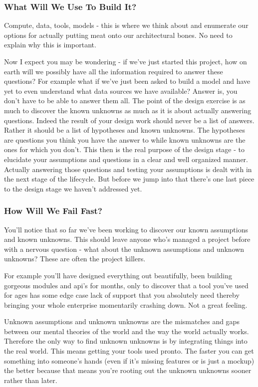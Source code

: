 \documentclass[10pt,a5paper]{book}
\begin{document}
\subsubsection{What Will We Use To Build It?}
Compute, data, tools, models - this is where we think about and enumerate our options for actually putting meat onto our architectural bones. No need to explain why this is important.

Now I expect you may be wondering - if we've just started this project, how on earth will we possibly have all the information required to answer these questions? For example what if we've just been asked to build a model and have yet to even understand what data sources we have available? Answer is, you don't have to be able to answer them all. The point of the design exercise is as much to discover the known unknowns as much as it is about actually answering questions. Indeed the result of your design work should never be a list of answers. Rather it should be a list of hypotheses and known unknowns. The hypotheses are questions you think you have the answer to while known unknowns are the ones for which you don't. This then is the real purpose of the design stage - to elucidate your assumptions and questions in a clear and well organized manner. Actually answering those questions and testing your assumptions is dealt with in the next stage of the lifecycle. But before we jump into that there's one last piece to the design stage we haven't addressed yet.

\subsubsection{How Will We Fail Fast?}
You'll notice that so far we've been working to discover our known assumptions and known unknowns. This should leave anyone who's managed a project before with a nervous question - what about the unknown assumptions and unknown unknowns? These are often the project killers. 

For example you'll have designed everything out beautifully, been building gorgeous modules and api's for months, only to discover that a tool you've used for ages has some edge case lack of support that you absolutely need thereby bringing your whole enterprise momentarily crashing down. Not a great feeling. 

Unknown assumptions and unknown unknowns are the mismatches and gaps between our mental theories of the world and the way the world actually works. Therefore the only way to find unknown unknowns is by integrating things into the real world. This means getting your tools used pronto. The faster you can get something into someone's hands (even if it's missing features or is just a mockup) the better because that means you're rooting out the unknown unknowns sooner rather than later. 
\end{document}
